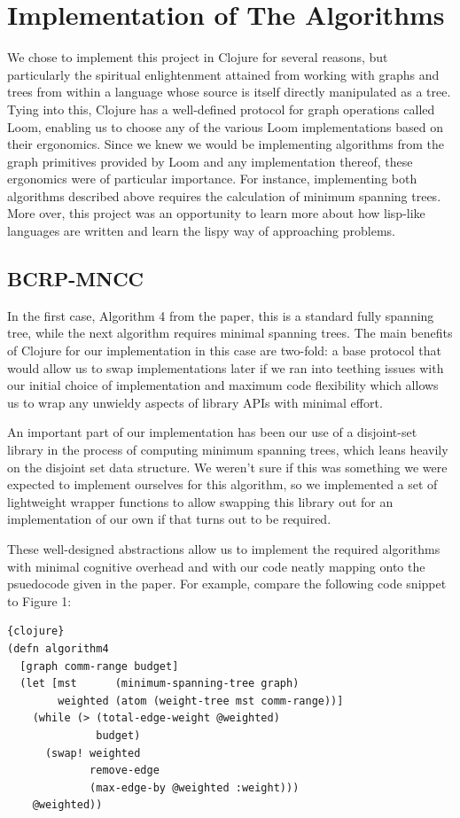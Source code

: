 \documentclass{article}
\begin{document}
\section{Implementation of The Algorithms}
We chose to implement this project in Clojure for several reasons, but particularly the spiritual enlightenment attained from working with graphs and trees from within a language whose source is itself directly manipulated as a tree.
Tying into this, Clojure has a well-defined protocol for graph operations called Loom, enabling us to choose any of the various Loom implementations based on their ergonomics.
Since we knew we would be implementing algorithms from the graph primitives provided by Loom and any implementation thereof, these ergonomics were of particular importance.
For instance, implementing both algorithms described above requires the calculation of minimum spanning trees.
More over, this project was an opportunity to learn more about how lisp-like languages are written and learn the lispy way of approaching problems.
\subsection{BCRP-MNCC}
In the first case, Algorithm 4 from the paper, this is a standard fully spanning tree, while the next algorithm requires minimal spanning trees.
The main benefits of Clojure for our implementation in this case are two-fold: a base protocol that would allow us to swap implementations later if we ran into teething issues with our initial choice of implementation and maximum code flexibility which allows us to wrap any unwieldy aspects of library APIs with minimal effort.

An important part of our implementation has been our use of a disjoint-set library in the process of computing minimum spanning trees, which leans heavily on the disjoint set data structure.
We weren't sure if this was something we were expected to implement ourselves for this algorithm, so we implemented a set of lightweight wrapper functions to allow swapping this library out for an implementation of our own if that turns out to be required.

These well-designed abstractions allow us to implement the required algorithms with minimal cognitive overhead and with our code neatly mapping onto the psuedocode given in the paper.
For example, compare the following code snippet to Figure 1:

\begin{lstlisting}{clojure}
(defn algorithm4
  [graph comm-range budget]
  (let [mst      (minimum-spanning-tree graph)
        weighted (atom (weight-tree mst comm-range))]
    (while (> (total-edge-weight @weighted)
              budget)
      (swap! weighted
             remove-edge
             (max-edge-by @weighted :weight)))
    @weighted))
  \end{lstlisting}
\end{document}
